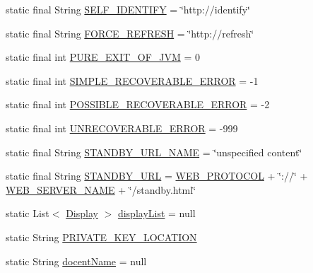 \begin{DoxyCompactItemize}
\item 
static final String \hyperlink{classgov_1_1fnal_1_1ppd_1_1dd_1_1GlobalVariables_aaaf6fe49f89ce39ddba1fac773161acf}{S\-E\-L\-F\-\_\-\-I\-D\-E\-N\-T\-I\-F\-Y} = \char`\"{}http\-://identify\char`\"{}
\item 
static final String \hyperlink{classgov_1_1fnal_1_1ppd_1_1dd_1_1GlobalVariables_a79c44481889ff937b51e30d13d9c1c35}{F\-O\-R\-C\-E\-\_\-\-R\-E\-F\-R\-E\-S\-H} = \char`\"{}http\-://refresh\char`\"{}
\item 
static final int \hyperlink{classgov_1_1fnal_1_1ppd_1_1dd_1_1GlobalVariables_a9a5a3b99227fe4929fc0c3c664a922da}{P\-U\-R\-E\-\_\-\-E\-X\-I\-T\-\_\-\-O\-F\-\_\-\-J\-V\-M} = 0
\item 
static final int \hyperlink{classgov_1_1fnal_1_1ppd_1_1dd_1_1GlobalVariables_aa1eece63cce68ac0186379fc2fa2272a}{S\-I\-M\-P\-L\-E\-\_\-\-R\-E\-C\-O\-V\-E\-R\-A\-B\-L\-E\-\_\-\-E\-R\-R\-O\-R} = -\/1
\item 
static final int \hyperlink{classgov_1_1fnal_1_1ppd_1_1dd_1_1GlobalVariables_a9e5673ef7b6da85febe9775aebc9504c}{P\-O\-S\-S\-I\-B\-L\-E\-\_\-\-R\-E\-C\-O\-V\-E\-R\-A\-B\-L\-E\-\_\-\-E\-R\-R\-O\-R} = -\/2
\item 
static final int \hyperlink{classgov_1_1fnal_1_1ppd_1_1dd_1_1GlobalVariables_af2d69bd16e463355307ead1135160408}{U\-N\-R\-E\-C\-O\-V\-E\-R\-A\-B\-L\-E\-\_\-\-E\-R\-R\-O\-R} = -\/999
\item 
static final String \hyperlink{classgov_1_1fnal_1_1ppd_1_1dd_1_1GlobalVariables_a95b7cd98e8cf8f461bff828889a3e6f0}{S\-T\-A\-N\-D\-B\-Y\-\_\-\-U\-R\-L\-\_\-\-N\-A\-M\-E} = \char`\"{}unspecified content\char`\"{}
\item 
static final String \hyperlink{classgov_1_1fnal_1_1ppd_1_1dd_1_1GlobalVariables_a7519a50604167fa9cf1c9e51cd4a6267}{S\-T\-A\-N\-D\-B\-Y\-\_\-\-U\-R\-L} = \hyperlink{classgov_1_1fnal_1_1ppd_1_1dd_1_1GlobalVariables_aa3bf05d555f0c3489c60664ae54a2480}{W\-E\-B\-\_\-\-P\-R\-O\-T\-O\-C\-O\-L} + \char`\"{}\-://\char`\"{} + \hyperlink{classgov_1_1fnal_1_1ppd_1_1dd_1_1GlobalVariables_af5ffb15826513fabba402ec017edbc70}{W\-E\-B\-\_\-\-S\-E\-R\-V\-E\-R\-\_\-\-N\-A\-M\-E} + \char`\"{}/standby.\-html\char`\"{}
\item 
static List$<$ \hyperlink{interfacegov_1_1fnal_1_1ppd_1_1dd_1_1signage_1_1Display}{Display} $>$ \hyperlink{classgov_1_1fnal_1_1ppd_1_1dd_1_1GlobalVariables_a30efdc2ab60dd04f76dc1210b8447426}{display\-List} = null
\item 
static String \hyperlink{classgov_1_1fnal_1_1ppd_1_1dd_1_1GlobalVariables_aa26c21d05850efb85c8f5517d8258e5d}{P\-R\-I\-V\-A\-T\-E\-\_\-\-K\-E\-Y\-\_\-\-L\-O\-C\-A\-T\-I\-O\-N}
\item 
static String \hyperlink{classgov_1_1fnal_1_1ppd_1_1dd_1_1GlobalVariables_a1a8699e7b2ec1e9cad652869fedafa2b}{docent\-Name} = null
\end{DoxyCompactItemize}


